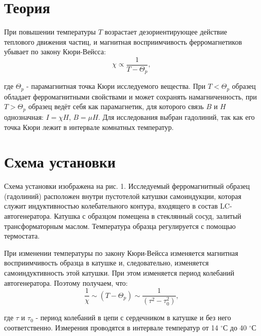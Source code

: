 

\newcommand{\formula}[3]
{
    \noindent#1\\[0.1cm]
    \begin{equation}\label{#2}
        #3
    \end{equation}
}

\newcommand{\mth}[1]
{
    \begin{math}
        #1
    \end{math}
}

\newcommand{\ruB}[1]
{
    _{\text{#1}}
}

\section{Теория}

\formula
{При повышении температуры $T$ возрастает дезориентирующее действие теплового движения частиц, и магнитная восприимчивость ферромагнетиков убывает по закону Кюри-Вейсса:}
{CurieWeissLaw}
{\chi \propto \frac{1}{T - \Theta_p},}

где $\Theta_p$ - парамагнитная точка Кюри исследуемого вещества. При $T < \Theta_p$ образец обладает ферромагнитными свойствами и может сохранять намагниченность, при $T > \Theta_p$ образец ведёт себя как парамагнетик, для которого связь $B$ и $H$ однозначная: $I = \chi H$, $B = \mu H$. Для исследования выбран гадолиний, так как его точка Кюри лежит в интервале комнатных температур.

\section{Схема установки}


Схема установки изображена на рис. 1. Исследуемый ферромагнитный образец (гадолиний) расположен внутри пустотелой катушки самоиндукции, которая служит индуктивностью колебательного контура, входящего в состав LC-автогенератора. Катушка с образцом помещена в стеклянный сосуд, залитый трансформаторным маслом. Температура образца регулируется с помощью термостата.
\formula
{При изменении температуры по закону Кюри-Вейсса изменяется магнитная восприимчивость образца в катушке и, следовательно, изменяется самоиндуктивность этой катушки. При этом изменяется период колебаний автогенератора. Поэтому получаем, что:}
{CurieWeissLawConsequence}
{\frac{1}{\chi} \sim (T - \Theta_p) \sim \frac{1}{(\tau^2 - \tau_0^2)},}

где $\tau$ и $\tau_0$ - период колебаний в цепи с сердечником в катушке и без него соответственно. Измерения проводятся в интервале температур от 14 $^{\circ}$С до 40 $^{\circ}$С
